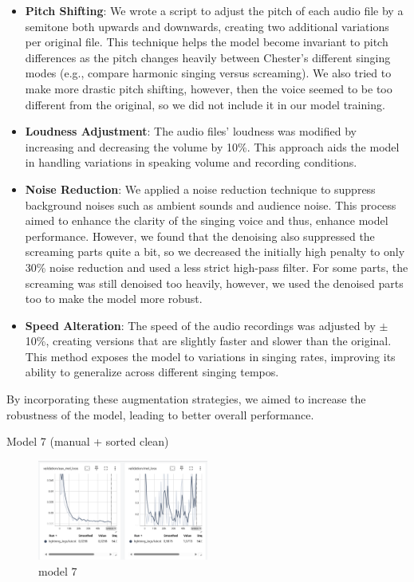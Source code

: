 \documentclass[a4paper]{article}
\begin{document}
\begin{itemize}
    \item \textbf{Pitch Shifting}: We wrote a script to adjust the pitch of each audio file by a semitone both upwards and downwards, creating two additional variations per original file. This technique helps the model become invariant to pitch differences as the pitch changes heavily between Chester’s different singing modes (e.g., compare harmonic singing versus screaming). We also tried to make more drastic pitch shifting, however, then the voice seemed to be too different from the original, so we did not include it in our model training.

    \item \textbf{Loudness Adjustment}: The audio files’ loudness was modified by increasing and decreasing the volume by 10\%. This approach aids the model in handling variations in speaking volume and recording conditions.

    \item \textbf{Noise Reduction}: We applied a noise reduction technique to suppress background noises such as ambient sounds and audience noise. This process aimed to enhance the clarity of the singing voice and thus, enhance model performance. However, we found that the denoising also suppressed the screaming parts quite a bit, so we decreased the initially high penalty to only 30\% noise reduction and used a less strict high-pass filter. For some parts, the screaming was still denoised too heavily, however, we used the denoised parts too to make the model more robust.

    \item \textbf{Speed Alteration}: The speed of the audio recordings was adjusted by $\pm$10\%, creating versions that are slightly faster and slower than the original. This method exposes the model to variations in singing rates, improving its ability to generalize across different singing tempos.
\end{itemize}

By incorporating these augmentation strategies, we aimed to increase the robustness of the model, leading to better overall performance.


Model 7 (manual + sorted clean)

\begin{figure}[htbp]
    \centering
    \includegraphics[width=0.5\textwidth]{graphics/v7_testing.png}
    \caption{model 7}
    \label{fig:bild4}
\end{figure}
\end{document}
